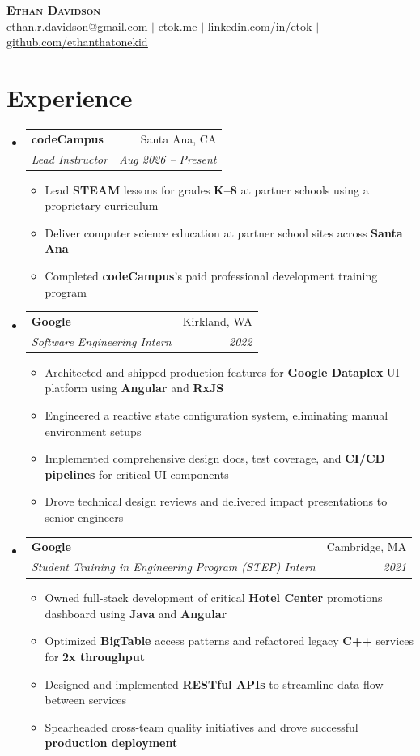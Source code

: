 \documentclass[letterpaper,11pt]{article}
\makeatletter
\newcommand{\resumeItem}[1]{
  \item\small{
    {#1 \vspace{-2pt}}
  }
}
\newcommand{\resumeSubheading}[4]{
  \vspace{-2pt}\item
    \begin{tabular*}{0.97\textwidth}[t]{l@{\extracolsep{\fill}}r}
      \textbf{#1} & #2 \\
      \textit{\small#3} & \textit{\small #4} \\
    \end{tabular*}\vspace{-7pt}
}
\newcommand{\resumeSubHeadingListStart}{\begin{itemize}[leftmargin=0.15in, label={}]}
\newcommand{\resumeSubHeadingListEnd}{\end{itemize}}
\newcommand{\resumeItemListStart}{\begin{itemize}}
\newcommand{\resumeItemListEnd}{\end{itemize}\vspace{-5pt}}
\makeatother
\begin{document}
\begin{center}
  \textbf{\Huge \scshape Ethan Davidson} \\ \vspace{1pt}
  \small \href{mailto:ethan.r.davidson@gmail.com}{\underline{ethan.r.davidson@gmail.com}} $|$ 
  \href{https://etok.me}{\underline{etok.me}} $|$
  \href{https://linkedin.com/in/etok}{\underline{linkedin.com/in/etok}} $|$
  \href{https://github.com/ethanthatonekid}{\underline{github.com/ethanthatonekid}}
\end{center}

\section{Experience}
\resumeSubHeadingListStart
  \resumeSubheading
    {codeCampus}{Santa Ana, CA}
    {Lead Instructor}{Aug 2026 -- Present}
    
    \resumeItemListStart
      \resumeItem{Lead \textbf{STEAM} lessons for grades \textbf{K--8} at partner schools using a proprietary curriculum}
      \resumeItem{Deliver computer science education at partner school sites across \textbf{Santa Ana}}
      \resumeItem{Completed \textbf{codeCampus}'s paid professional development training program}
    \resumeItemListEnd

  \resumeSubheading
    {Google}{Kirkland, WA}
    {Software Engineering Intern}{2022}
    
    \resumeItemListStart
      \resumeItem{Architected and shipped production features for \textbf{Google Dataplex} UI platform using \textbf{Angular} and \textbf{RxJS}}
      \resumeItem{Engineered a reactive state configuration system, eliminating manual environment setups}
      \resumeItem{Implemented comprehensive design docs, test coverage, and \textbf{CI/CD pipelines} for critical UI components}
      \resumeItem{Drove technical design reviews and delivered impact presentations to senior engineers}
    \resumeItemListEnd

  \resumeSubheading
    {Google}{Cambridge, MA}
    {Student Training in Engineering Program (STEP) Intern}{2021}
    \resumeItemListStart
      \resumeItem{Owned full-stack development of critical \textbf{Hotel Center} promotions dashboard using \textbf{Java} and \textbf{Angular}}
      \resumeItem{Optimized \textbf{BigTable} access patterns and refactored legacy \textbf{C++} services for \textbf{2x throughput}}
      \resumeItem{Designed and implemented \textbf{RESTful APIs} to streamline data flow between services}
      \resumeItem{Spearheaded cross-team quality initiatives and drove successful \textbf{production deployment}}
    \resumeItemListEnd
\resumeSubHeadingListEnd
\end{document}
